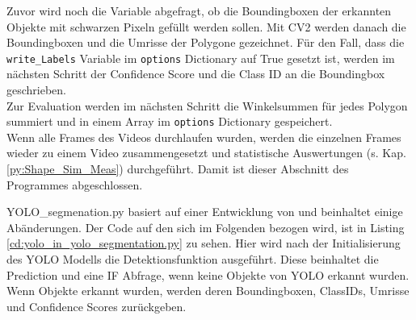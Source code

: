 {	Zuvor wird noch die Variable abgefragt, ob die Boundingboxen der erkannten Objekte mit schwarzen Pixeln gefüllt werden sollen. Mit CV2 werden danach die Boundingboxen und die Umrisse der Polygone gezeichnet. Für den Fall, dass die \lstinline|write_Labels| Variable im \lstinline|options| Dictionary auf True gesetzt ist, werden im nächsten Schritt der Confidence Score und die Class ID an die Boundingbox geschrieben. \\
	Zur Evaluation werden im nächsten Schritt die Winkelsummen für jedes Polygon summiert und in einem Array im \lstinline|options| Dictionary gespeichert. \\
	Wenn alle Frames des Videos durchlaufen wurden, werden die einzelnen Frames wieder zu einem Video zusammengesetzt und statistische Auswertungen (s. Kap. \ref{py:Shape_Sim_Meas}) durchgeführt. Damit ist dieser Abschnitt des Programmes abgeschlossen.\\
	\ifimportant
	
	\fi YOLO\_segmenation.py basiert auf einer Entwicklung von \citeauthor{Canu_pysource} \citep{Canu_pysource} und beinhaltet einige Abänderungen. \ifimportant Der Code auf den sich im Folgenden bezogen wird, ist in Listing \ref{cd:yolo_in_yolo_segmentation.py} zu sehen. \fi Hier wird nach der Initialisierung des YOLO Modells die Detektionsfunktion ausgeführt. Diese beinhaltet die Prediction und eine IF Abfrage, wenn keine Objekte von YOLO erkannt wurden. Wenn Objekte erkannt wurden, werden deren Boundingboxen, ClassIDs, Umrisse und Confidence Scores zurückgeben. 
	}


